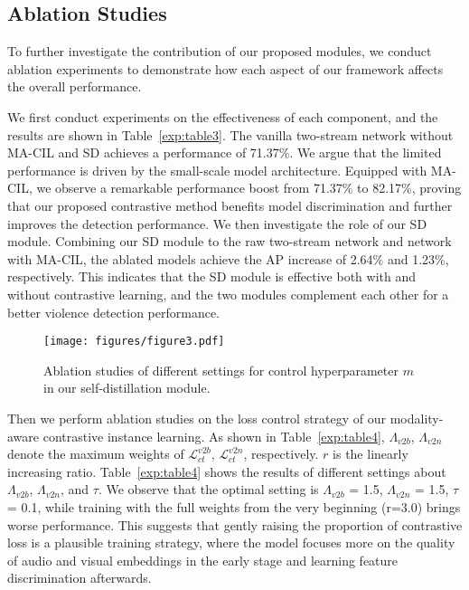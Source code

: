 \documentclass[sigconf]{acmart}
\begin{document}
\subsection{Ablation Studies}

To further investigate the contribution of our proposed modules, we conduct ablation experiments to demonstrate how each aspect of our framework affects the overall performance.

We first conduct experiments on the effectiveness of each component, and the results are shown in Table~\ref{exp:table3}. The vanilla two-stream network without MA-CIL and SD achieves a performance of 71.37\%. We argue that the limited performance is driven by the small-scale model architecture. Equipped with MA-CIL, we observe a remarkable performance boost from 71.37\% to 82.17\%, proving that our proposed contrastive method benefits model discrimination and further improves the detection performance. We then investigate the role of our SD module. Combining our SD module to the raw two-stream network and network with MA-CIL, the ablated models achieve the AP increase of 2.64\% and 1.23\%, respectively. This indicates that the SD module is effective both with and without contrastive learning, and the two modules complement each other for a better violence detection performance.

\begin{figure}[tb]
\centering
\texttt{[image: figures/figure3.pdf]}
\vspace{-2mm}
\caption{Ablation studies of different settings for control hyperparameter $m$ in our self-distillation module.}
\vspace{-2mm}
\label{figure3}
\end{figure}

Then we perform ablation studies on the loss control strategy of our modality-aware contrastive instance learning. As shown in Table~\ref{exp:table4}, $\Lambda_{v2b}$, $\Lambda_{v2n}$ denote the maximum weights of $\mathcal{L}_{ct}^{v2b}$, $\mathcal{L}_{ct}^{v2n}$, respectively. $r$ is the linearly increasing ratio. Table~\ref{exp:table4} shows the results of different settings about $\Lambda_{v2b}$, $\Lambda_{v2n}$, and $\tau$. We observe that the optimal setting is $\Lambda_{v2b}$ = 1.5, $\Lambda_{v2n}$ = 1.5, $\tau$ = 0.1, while training with the full weights from the very beginning (r=3.0) brings worse performance. This suggests that gently raising the proportion of contrastive loss is a plausible training strategy, where the model focuses more on the quality of audio and visual embeddings in the early stage and learning feature discrimination afterwards.
\end{document}
